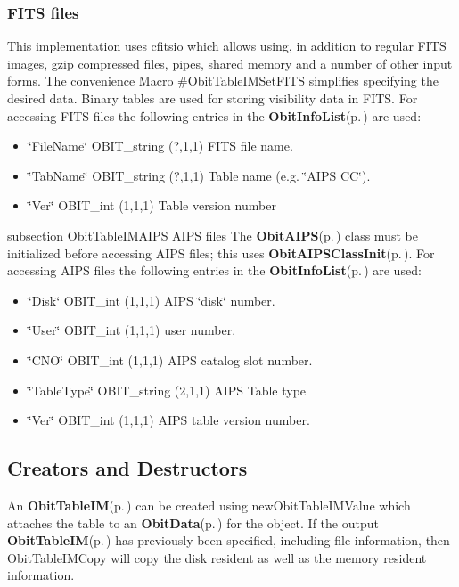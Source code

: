 \subsubsection{FITS files}\label{ObitTableWX_8h_TableFITS}
This implementation uses cfitsio which allows using, in addition to regular FITS images, gzip compressed files, pipes, shared memory and a number of other input forms. The convenience Macro \#Obit\-Table\-IMSet\-FITS simplifies specifying the desired data. Binary tables are used for storing visibility data in FITS. For accessing FITS files the following entries in the {\bf Obit\-Info\-List}{\rm (p.\,\pageref{structObitInfoList})} are used: \begin{itemize}
\item \char`\"{}File\-Name\char`\"{} OBIT\_\-string (?,1,1) FITS file name. \item \char`\"{}Tab\-Name\char`\"{} OBIT\_\-string (?,1,1) Table name (e.g. \char`\"{}AIPS CC\char`\"{}). \item \char`\"{}Ver\char`\"{} OBIT\_\-int (1,1,1) Table version number\end{itemize}
subsection Obit\-Table\-IMAIPS AIPS files The {\bf Obit\-AIPS}{\rm (p.\,\pageref{structObitAIPS})} class must be initialized before accessing AIPS files; this uses {\bf Obit\-AIPSClass\-Init}{\rm (p.\,\pageref{ObitAIPS_8c_a5})}. For accessing AIPS files the following entries in the {\bf Obit\-Info\-List}{\rm (p.\,\pageref{structObitInfoList})} are used: \begin{itemize}
\item \char`\"{}Disk\char`\"{} OBIT\_\-int (1,1,1) AIPS \char`\"{}disk\char`\"{} number. \item \char`\"{}User\char`\"{} OBIT\_\-int (1,1,1) user number. \item \char`\"{}CNO\char`\"{} OBIT\_\-int (1,1,1) AIPS catalog slot number. \item \char`\"{}Table\-Type\char`\"{} OBIT\_\-string (2,1,1) AIPS Table type \item \char`\"{}Ver\char`\"{} OBIT\_\-int (1,1,1) AIPS table version number.\end{itemize}
\subsection{Creators and Destructors}\label{ObitTableIM_8h_ObitTableIMaccess}
An {\bf Obit\-Table\-IM}{\rm (p.\,\pageref{structObitTableIM})} can be created using new\-Obit\-Table\-IMValue which attaches the table to an {\bf Obit\-Data}{\rm (p.\,\pageref{structObitData})} for the object. If the output {\bf Obit\-Table\-IM}{\rm (p.\,\pageref{structObitTableIM})} has previously been specified, including file information, then Obit\-Table\-IMCopy will copy the disk resident as well as the memory resident information.

